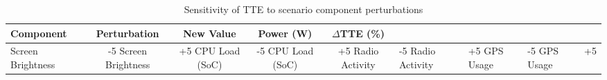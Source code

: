 \begin{table}[htbp]
\centering
\caption{Sensitivity of TTE to scenario component perturbations}
\label{tab:scenario_sensitivity}
\begin{tabular}{lcccc}
\hline
Component & Perturbation & New Value & Power (W) & $\Delta$TTE (\%) \\
\hline
Screen Brightness & -5%
Screen Brightness & +5%
CPU Load (SoC) & -5%
CPU Load (SoC) & +5%
Radio Activity & -5%
Radio Activity & +5%
GPS Usage & -5%
GPS Usage & +5%
\hline
\end{tabular}
\end{table}
